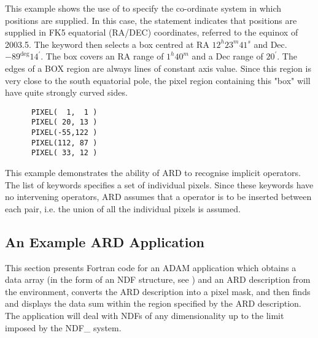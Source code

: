 This example shows the use of  to specify the
co-ordinate system in which positions are supplied. In this case, the
 statement indicates that positions are
supplied in FK5 equatorial (RA/DEC) coordinates, referred to the equinox
of 2003.5. The  keyword then selects a box centred
at RA $12^{h}23^{m}41^{s}$ and Dec. $-89^{\deg}14^{'}$. The box covers an
RA range of $1^{h}40^{m}$ and a Dec range of $20^{'}$. The edges of a BOX
region are always lines of constant axis value. Since this region is very
close to the south equatorial pole, the pixel region containing this
"box" will have quite strongly curved sides.

\small
\begin{verbatim}
      PIXEL(  1,  1 )
      PIXEL( 20, 13 )
      PIXEL(-55,122 )
      PIXEL(112, 87 )
      PIXEL( 33, 12 )
\end{verbatim}
\normalsize

This example demonstrates the ability of ARD to recognise implicit
 operators. The list of 
keywords specifies a set of individual pixels. Since these keywords have
no intervening operators, ARD assumes that a 
operator is to be inserted between each pair, i.e. the union of all the
individual pixels is assumed.

\subsection{\label{SEC:EXAMC}An Example ARD Application}

This section presents Fortran code for an ADAM application which obtains
a data array (in the form of an NDF structure, see ) 
and an ARD description from the environment, converts the ARD description
into a pixel mask, and then finds and displays the data sum within the
region specified by the ARD description. The application will deal with
NDFs of any dimensionality up to the limit imposed by the NDF\_ system.

